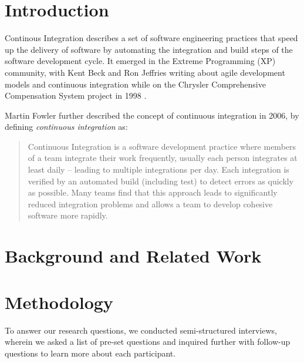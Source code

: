 \documentclass{sig-alternate}
\begin{document}


\section{Introduction}
Continous Integration describes a set of software engineering practices that speed up the delivery of software by automating the integration and build steps of the software development cycle. It emerged in the Extreme Programming (XP) community, with Kent Beck and Ron Jeffries writing about agile development models and continuous integration while on the Chrysler Comprehensive Compensation System project in 1998 \cite{beck:extreme_programming} \cite{beck:agile_manifesto}.

Martin Fowler further described the concept of continuous integration in 2006, by defining \textit{continuous integration} as:
\begin{quote}
Continuous Integration is a software development practice where members of a team integrate their work frequently, usually each person integrates at least daily -- leading to multiple integrations per day. Each integration is verified by an automated build (including test) to detect errors as quickly as possible. Many teams find that this approach leads to significantly reduced integration problems and allows a team to develop cohesive software more rapidly. \cite{fowler:continuous}
\end{quote}

\section{Background and Related Work}
\section{Methodology}
To answer our research questions, we conducted semi-structured interviews, wherein we asked a list of pre-set questions and inquired further with follow-up questions to learn more about each participant. \\
\end{document}
